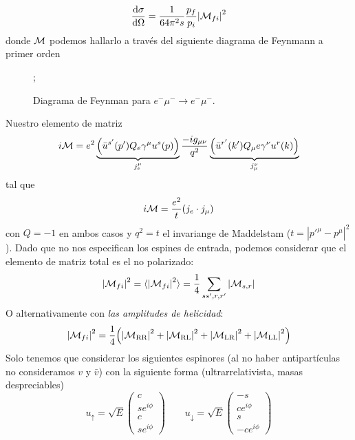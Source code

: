 \begin{equation}
	\dv{\sigma}{\Omega} = \frac{1}{64 \pi^2 s} \frac{p_f}{p_i} \vqty{\Mcal_{fi}}^2
\end{equation}
donde $\mathcal{M}$ podemos hallarlo a través del siguiente diagrama de Feynmann a primer orden
\begin{figure}[h]
	\centering
	;
	\caption{Diagrama de Feynman para \(e^- \mu^- \to e^- \mu^-\).}
\end{figure}
Nuestro elemento de matriz
\begin{equation}
	i \Mcal =e^2 \underbrace{\pqty{\bar{u}^{s'}(p') Q_e  \gamma^\mu u^{s}(p)}}_{j_e^\mu}  \frac{-ig_{\mu \nu}}{q^2}  \underbrace{\pqty{\bar{u}^{r'}(k') Q_\mu e \gamma^\nu u^{r}(k)}}_{{j_\mu^\nu} }
\end{equation}
tal que
\begin{equation}
	i \mathcal{M} =\frac{e^2}{t} (j_e \cdot j_\mu)
\end{equation}
con $Q=-1$ en ambos casos y $q^2=t$ el invariange de Maddelstam ($t=|p'^\mu-p^\mu|^2$). Dado que no nos especifican los espines de entrada, podemos considerar que el elemento de matriz total es el no polarizado:
\begin{equation}
	\vqty{\Mcal_{fi}}^2 = \langle \vqty{\Mcal_{fi}}^2 \rangle = \frac{1}{4} \sum_{ss',r,r'} \vqty{\Mcal_{s,r}}
\end{equation}
O alternativamente con \textit{las amplitudes de helicidad}:
\begin{equation}
	\vqty{\Mcal_{fi}}^2 = \frac{1}{4} \pqty{\vqty{\Mcal_{\text{RR}}}^2+\vqty{\Mcal_{\text{RL}}}^2
		+\vqty{\Mcal_{\text{LR}}}^2+\vqty{\Mcal_{\text{LL}}}^2}
\end{equation}
Solo tenemos que considerar los siguientes espinores (al no haber antipartículas no consideramos $v$ y $\bar{v}$) con  la siguiente forma (ultrarrelativista, masas despreciables)
\begin{equation}
	u_\uparrow = \sqrt{E} \begin{pmatrix}
		c \\ se^{i\phi} \\ c \\ se^{i\phi}
	\end{pmatrix} \qquad
	u_\downarrow= \sqrt{E} \begin{pmatrix}
		-s \\ ce^{i\phi} \\ s \\ -ce^{i\phi}
	\end{pmatrix}
\end{equation}
